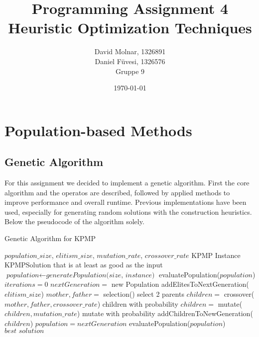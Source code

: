 \documentclass[11pt]{article}
\title{Programming Assignment 4\\ \vspace{10px} \large Heuristic Optimization Techniques}
\author{David Molnar, 1326891\\ Daniel Füvesi, 1326576\\Gruppe 9}
\date{\today}
\begin{document}
\lstset{language=Java}
\maketitle
 
\section{Population-based Methods}
\subsection{Genetic Algorithm}
\hspace{0.5cm}For this assignment we decided to implement a genetic algorithm. First the core algorithm and the operatos are described, followed by applied methods to improve performance and overall runtime. Previous implementations have been used, especially for generating random solutions with the construction heuristics. Below the pseudocode of the algorithm solely. \\
\begin{algorithm}
	\caption{Genetic Algorithm for KPMP}\label{euclid}
	\begin{algorithmic}[1]
		\Variables
		\State $population\_size$, $elitism\_size$, $mutation\_rate$, $crossover\_rate$
		\EndVariables
		\Require KPMP Instance
		\Ensure KPMPSolution that is at least as good as the input
		\State $\textit{population} \gets \textit{generatePopulation(size, instance)}$
		\State evaluatePopulation($population$)
		\State $\textit{iterations} = 0$
		\State $nextGeneration =$ new Population
		\State addElitesToNextGeneration($elitism\_size$)
		\State $mother, father = $ selection() \Comment select 2 parents
		\State $children = $ crossover($mother, father, crossover\_rate$) \Comment children with probability
		\State $children = $ mutate($children, mutation\_rate$) \Comment mutate with probability
		\State addChildrenToNewGeneration($children$)
		\EndWhile
		\State $population = nextGeneration$
		\State evaluatePopulation($population$)
		\EndWhile
		\Return $\textit{best solution}$
		\EndFunction
		
	\end{algorithmic}
\end{algorithm}
\end{document}
